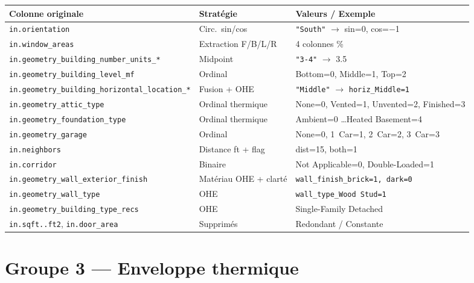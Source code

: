 \documentclass[11pt,a4paper]{article}
\begin{document}
\begin{longtable}{L{5.2cm}L{3cm}L{5.8cm}}
\toprule
\textbf{Colonne originale} & \textbf{Stratégie} & \textbf{Valeurs / Exemple} \\
\midrule
\endhead
{}
\texttt{in.orientation} & Circ.\ sin/cos & \texttt{"South"} $\to$ sin=0, cos=$-$1 \\
\texttt{in.window\_areas} & Extraction F/B/L/R & 4 colonnes \% \\
\texttt{in.geometry\_building\_number\_units\_*} & Midpoint & \texttt{"3-4"} $\to$ 3.5 \\
\texttt{in.geometry\_building\_level\_mf} & Ordinal & Bottom=0, Middle=1, Top=2 \\
\texttt{in.geometry\_building\_horizontal\_location\_*} & Fusion + OHE & \texttt{"Middle"} $\to$ \texttt{horiz\_Middle=1} \\
\texttt{in.geometry\_attic\_type} & Ordinal thermique & None=0, Vented=1, Unvented=2, Finished=3 \\
\texttt{in.geometry\_foundation\_type} & Ordinal thermique & Ambient=0 \dots Heated Basement=4 \\
\texttt{in.geometry\_garage} & Ordinal & None=0, 1~Car=1, 2~Car=2, 3~Car=3 \\
\texttt{in.neighbors} & Distance ft + flag & dist=15, both=1 \\
\texttt{in.corridor} & Binaire & Not Applicable=0, Double-Loaded=1 \\
\texttt{in.geometry\_wall\_exterior\_finish} & Matériau OHE + clarté & \texttt{wall\_finish\_brick=1, dark=0} \\
\texttt{in.geometry\_wall\_type} & OHE & \texttt{wall\_type\_Wood Stud=1} \\
\texttt{in.geometry\_building\_type\_recs} & OHE & Single-Family Detached \\
\texttt{in.sqft..ft2}, \texttt{in.door\_area} & Supprimés & Redondant / Constante \\
\bottomrule
\end{longtable}

\section{Groupe 3 — Enveloppe thermique}
\end{document}
